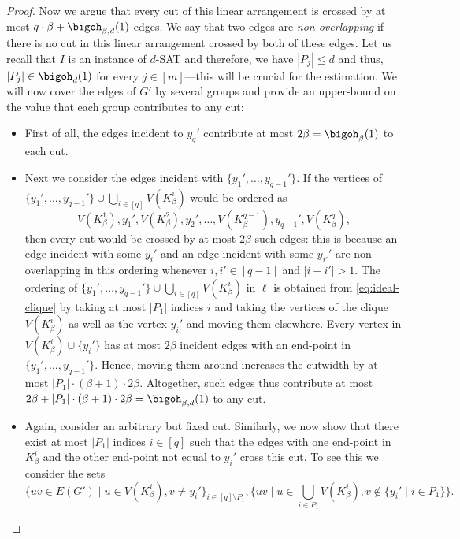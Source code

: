 \documentclass[a4paper,UKenglish,cleveref, autoref, thm-restate]{lipics-v2021}
\begin{document}
\begin{proof}
	Now we argue that every cut of this linear arrangement is crossed by at most $q \cdot \beta + \bigoh_{\beta, d}(1)$ edges.
	We say that two edges are \emph{non-overlapping} if there is no cut in this linear arrangement crossed by both of these edges.
	Let us recall that $I$ is an instance of $d$-\textsc{SAT} and therefore, we have $|P_j| \leq d$ and thus, $|P_j| \in \bigoh_d(1)$ for every $j \in [m]$---this will be crucial for the estimation.
	We will now cover the edges of $G'$ by several groups and provide an upper-bound on the value that each group contributes to any cut:
	\begin{itemize}
		\item First of all, the edges incident to $y_q'$ contribute at most $2\beta = \bigoh_\beta(1)$ to each cut.
		\item Next we consider the edges incident with $\{y_1', \dots, y_{q-1}'\}$. 
		If the vertices of $\{y_1', \dots, y_{q-1}'\} \cup \bigcup_{i \in [q]} V(K_\beta^i)$ would be ordered as 
		\begin{equation}\label{eq:ideal-clique}
			V(K_\beta^1), y_1', V(K_\beta^2), y_2', \dots, V(K_\beta^{q-1}), y_{q-1}', V(K_\beta^q), 
		\end{equation}
		then every cut would be crossed by at most $2 \beta$ such edges: this is because an edge incident with some $y_i'$ and an edge incident with some $y_{i'}'$ are non-overlapping in this ordering whenever $i, i' \in [q-1]$ and $|i - i'| > 1$.
		The ordering of $\{y_1', \dots, y_{q-1}'\} \cup \bigcup_{i \in [q]} V(K_\beta^i)$ in $\ell$ is obtained from \eqref{eq:ideal-clique} by taking at most $|P_1|$ indices $i$ and taking the vertices of the clique $V(K_\beta^i)$ as well as the vertex $y_i'$ and moving them elsewhere.
		Every vertex in $V(K_\beta^i) \cup \{y_i'\}$ has at most $2\beta$ incident edges with an end-point in $\{y_1', \dots, y_{q-1}'\}$.
		Hence, moving them around increases the cutwidth by at most $|P_1| \cdot (\beta + 1) \cdot 2 \beta$.
		Altogether, such edges thus contribute at most $2\beta + |P_1| \cdot (\beta + 1) \cdot 2 \beta = \bigoh_{\beta, d}(1)$ to any cut.
		\item Again, consider an arbitrary but fixed cut. 
		Similarly, we now show that there exist at most $|P_1|$ indices $i \in [q]$ such that the edges with one end-point in $K_\beta^i$ and the other end-point not equal to $y_i'$ cross this cut.
		To see this we consider the sets 
		\[
			\{u v \in E(G') \mid u \in V(K_\beta^i), v \neq y_i'\}_{i \in [q] \setminus P_1}, \{u v \mid u \in \bigcup_{i \in P_1} V(K_\beta^i), v \notin \{y_i' \mid i \in P_1\}\}.
\]
\end{itemize}
\end{proof}
\end{document}
